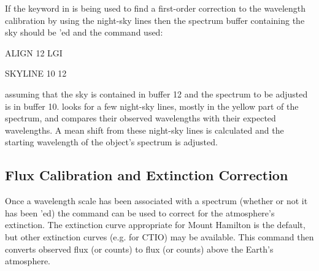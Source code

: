 If the  keyword in  is being used to find a first-order
correction to the wavelength calibration by using the night-sky lines then the
spectrum buffer containing the sky should be 'ed and the
 command used:
\begin{command}
   \item ALIGN 12 LGI
   \item SKYLINE 10 12
\end{command}
\noindent
assuming that the sky is contained in buffer 12 and the spectrum to be
adjusted is in buffer 10.   looks for a few night-sky lines,
mostly in the yellow part of the spectrum, and compares their observed
wavelengths with their expected wavelengths.  A mean shift from these
night-sky lines is calculated and the starting wavelength of the object's
spectrum is adjusted.

\subsection{Flux Calibration and Extinction Correction}

Once a wavelength scale has been associated with a spectrum (whether or not it
has been 'ed) the  command can be used to correct
for the atmosphere's extinction.  The extinction curve appropriate for Mount
Hamilton is the default, but other extinction curves (e.g. for CTIO) may be
available.  This command then converts observed flux (or counts) to flux (or
counts) above the Earth's atmosphere.


